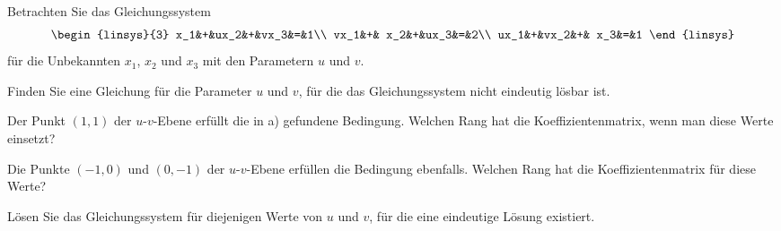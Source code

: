 Betrachten Sie das Gleichungssystem \[
\begin{linsys}{3}
 x_1&+&ux_2&+&vx_3&=&1\\
vx_1&+& x_2&+&ux_3&=&2\\
ux_1&+&vx_2&+& x_3&=&1
\end{linsys}
\]
für die Unbekannten $x_1$, $x_2$ und $x_3$ mit den Parametern $u$ und $v$.
\begin{teilaufgaben}
\item
Finden Sie eine Gleichung für die Parameter $u$ und $v$, für die das
Gleichungssystem nicht eindeutig lösbar ist.
\item
Der Punkt $(1,1)$ der $u$-$v$-Ebene erfüllt die in a) gefundene Bedingung. 
Welchen Rang hat die Koeffizientenmatrix, wenn man diese Werte einsetzt?
\item
Die Punkte $(-1,0)$ und $(0,-1)$ der $u$-$v$-Ebene erfüllen die Bedingung
ebenfalls.
Welchen Rang hat die Koeffizientenmatrix für diese Werte?
\item
Lösen Sie das Gleichungssystem für diejenigen Werte von $u$ und $v$,
für die eine eindeutige Lösung existiert.
\end{teilaufgaben}


